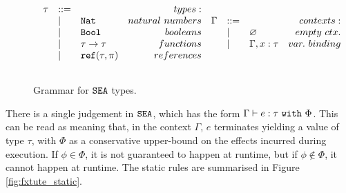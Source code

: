 \begin{figure}[h]

\[
\begin{array}{c}

\begin{array}{lllr}

\tau & ::= & ~ & types: \\
	& | & \mathtt{Nat} & natural~numbers \\
	& | & \mathtt{Bool} & booleans \\
	& | & \tau \rightarrow \tau & functions \\
	& | & \mathtt{ref}(\tau, \pi) & references \\
	&&\\

\end{array}

\begin{array}{lllr}
	
\Gamma & ::= & ~ & contexts: \\
	& | & \varnothing & empty~ctx. \\
	& | & \Gamma, x: \tau & var.~binding \\
	&&\\
\end{array}

\end{array}
\]

\vspace{-12pt}
\caption{Grammar for $\mathtt{SEA}$ types.}
\label{fig:fxtute_types}
\end{figure}

There is a single judgement in $\mathtt{SEA}$, which has the form $\Gamma \vdash e: \tau~\mathtt{with}~ \Phi$. This can be read as meaning that, in the context $\Gamma$, $e$ terminates yielding a value of type $\tau$, with $\Phi$ as a conservative upper-bound on the effects incurred during execution. If $\phi \in \Phi$, it is not guaranteed to happen at runtime, but if $\phi \notin \Phi$, it cannot happen at runtime. The static rules are summarised in Figure \ref{fig:fxtute_static}.

